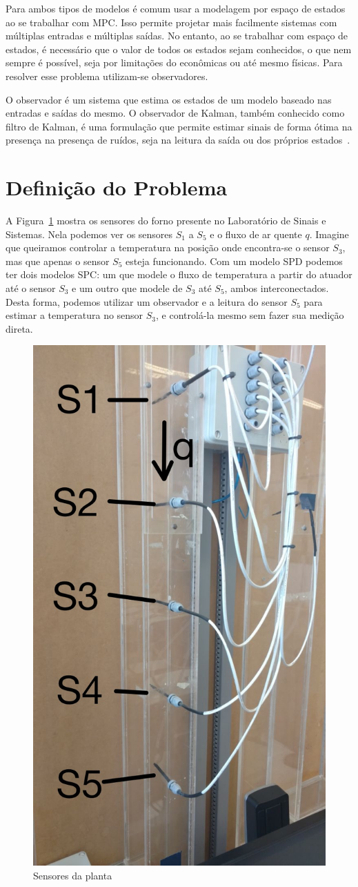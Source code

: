Para ambos tipos de modelos é comum usar a modelagem por espaço de estados ao se
trabalhar com \ac{MPC}. Isso permite projetar mais facilmente sistemas com
múltiplas entradas e múltiplas saídas. No entanto, ao se trabalhar com espaço de
estados, é necessário que o valor de todos os estados sejam conhecidos, o que
nem sempre é possível, seja por limitações do econômicas ou até mesmo físicas.
Para resolver esse problema utilizam-se observadores.

O observador é um sistema que estima os estados de um modelo baseado nas
entradas e saídas do mesmo. O observador de Kalman, também conhecido como filtro
de Kalman, é uma formulação que permite estimar sinais de forma ótima na
presença na presença de ruídos, seja na leitura da saída ou dos próprios
estados~\cite{book:wang}.

\section{Definição do Problema}%
\label{sec:definicao-do-problema}

A Figura~\ref{fig:sensors-SPD} mostra os sensores do forno presente no
Laboratório de Sinais e Sistemas. Nela podemos ver os sensores \(S_1\) a \(S_5\)
e o fluxo de ar quente \( q \). Imagine que queiramos controlar a temperatura na
posição onde encontra-se o sensor \(S_3\), mas que apenas o sensor \(S_5\)
esteja funcionando. Com um modelo \ac{SPD} podemos ter dois modelos \ac{SPC}\@:
um que modele o fluxo de temperatura a partir do atuador até o sensor \(S_3\) e
um outro que modele de \(S_3\) até \(S_5\), ambos interconectados. Desta forma,
podemos utilizar um observador e a leitura do sensor \(S_5\) para estimar a
temperatura no sensor \(S_3\), e controlá-la mesmo sem fazer sua medição direta.

\begin{figure}[ht!]
    \centering
    \captionsetup{justification=centering}
    \includegraphics[height=0.5\linewidth]{imgs/planta-spd}
    \caption{Sensores da planta}%
    \label{fig:sensors-SPD}
\end{figure}

